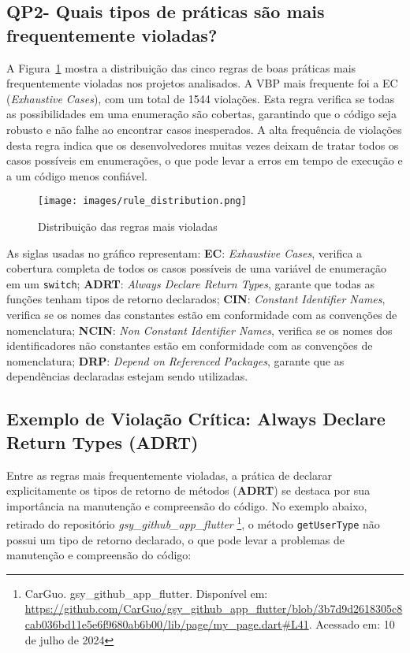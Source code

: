 \documentclass[12pt]{article}
\begin{document}
\subsection{QP2- Quais tipos de práticas são mais frequentemente violadas?}
A Figura~\ref{fig:rule_distribution} mostra a distribuição das cinco regras de boas práticas mais frequentemente violadas nos projetos analisados. A VBP mais frequente foi a EC (\textit{Exhaustive Cases}), com um total de 1544 violações. Esta regra verifica se todas as possibilidades em uma enumeração são cobertas, garantindo que o código seja robusto e não falhe ao encontrar casos inesperados. A alta frequência de violações desta regra indica que os desenvolvedores muitas vezes deixam de tratar todos os casos possíveis em enumerações, o que pode levar a erros em tempo de execução e a um código menos confiável.

\begin{figure}[H]
\centering
\texttt{[image: images/rule\_distribution.png]}
\caption{Distribuição das regras mais violadas}
\label{fig:rule_distribution}
\end{figure}

As siglas usadas no gráfico representam: \textbf{EC}: \textit{Exhaustive Cases}, verifica a cobertura completa de todos os casos possíveis de uma variável de enumeração em um \texttt{switch}; \textbf{ADRT}: \textit{Always Declare Return Types}, garante que todas as funções tenham tipos de retorno declarados; \textbf{CIN}: \textit{Constant Identifier Names}, verifica se os nomes das constantes estão em conformidade com as convenções de nomenclatura; \textbf{NCIN}: \textit{Non Constant Identifier Names}, verifica se os nomes dos identificadores não constantes estão em conformidade com as convenções de nomenclatura; \textbf{DRP}: \textit{Depend on Referenced Packages}, garante que as dependências declaradas estejam sendo utilizadas.

\subsection{Exemplo de Violação Crítica: Always Declare Return Types (ADRT)}
Entre as regras mais frequentemente violadas, a prática de declarar explicitamente os tipos de retorno de métodos (\textbf{ADRT}) se destaca por sua importância na manutenção e compreensão do código. No exemplo abaixo, retirado do repositório \textit{gsy\_github\_app\_flutter} \footnote{CarGuo. gsy\_github\_app\_flutter. Disponível em: \url{https://github.com/CarGuo/gsy\_github_app\_flutter/blob/3b7d9d2618305c8cab036bd11e5e6f9680ab6b00/lib/page/my\_page.dart#L41}. Acessado em: 10 de julho de 2024}, o método \texttt{getUserType}  não possui um tipo de retorno declarado, o que pode levar a problemas de manutenção e compreensão do código:
\end{document}
